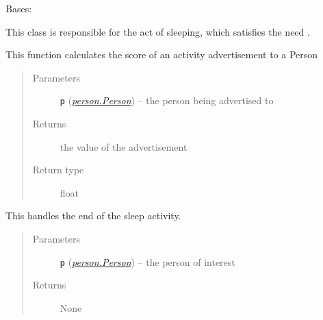 \documentclass[letterpaper,10pt,english]{sphinxmanual}
\begin{document}
\begin{fulllineitems}
\label{sleep:sleep.Sleep}
Bases: {\hyperref[activity:activity.Activity]{\emph{}}}

This class is responsible for the act of sleeping, which satisfies the need {\hyperref[rest:rest.Rest]{\emph{}}}.

\begin{fulllineitems}
\label{sleep:sleep.Sleep.advertise}
This function calculates the score of an activity advertisement to a Person
\begin{quote}\begin{description}
\item[{Parameters}] \leavevmode
\textbf{\texttt{p}} ({\hyperref[person:person.Person]{\emph{\emph{person.Person}}}}) -- the person being advertised to

\item[{Returns}] \leavevmode
the value of the advertisement

\item[{Return type}] \leavevmode
float

\end{description}\end{quote}

\end{fulllineitems}


\begin{fulllineitems}
\label{sleep:sleep.Sleep.end}
This handles the end of the sleep activity.
\begin{quote}\begin{description}
\item[{Parameters}] \leavevmode
\textbf{\texttt{p}} ({\hyperref[person:person.Person]{\emph{\emph{person.Person}}}}) -- the person of interest

\item[{Returns}] \leavevmode
None

\end{description}\end{quote}

\end{fulllineitems}



\end{fulllineitems}
\end{document}
